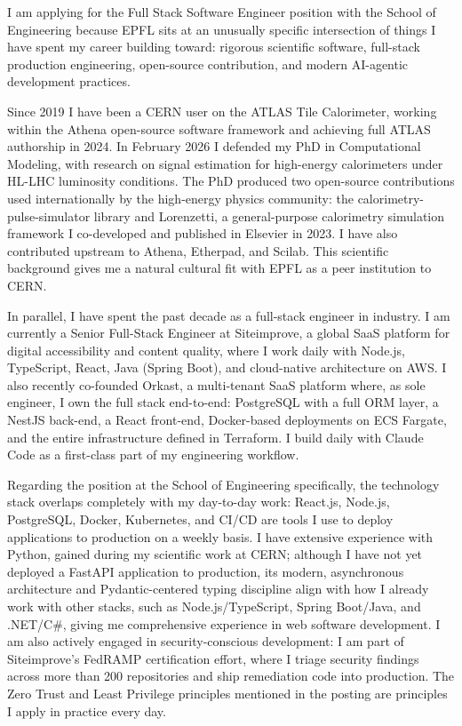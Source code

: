 \documentclass[11pt,a4paper]{article}
\begin{document}


I am applying for the Full Stack Software Engineer position with the School of Engineering because EPFL sits at an unusually specific intersection of things I have spent my career building toward: rigorous scientific software, full-stack production engineering, open-source contribution, and modern AI-agentic development practices.

Since 2019 I have been a CERN user on the ATLAS Tile Calorimeter, working within the Athena open-source software framework and achieving full ATLAS authorship in 2024. In February 2026 I defended my PhD in Computational Modeling, with research on signal estimation for high-energy calorimeters under HL-LHC luminosity conditions. The PhD produced two open-source contributions used internationally by the high-energy physics community: the calorimetry-pulse-simulator library and Lorenzetti, a general-purpose calorimetry simulation framework I co-developed and published in Elsevier in 2023. I have also contributed upstream to Athena, Etherpad, and Scilab. This scientific background gives me a natural cultural fit with EPFL as a peer institution to CERN.

In parallel, I have spent the past decade as a full-stack engineer in industry. I am currently a Senior Full-Stack Engineer at Siteimprove, a global SaaS platform for digital accessibility and content quality, where I work daily with Node.js, TypeScript, React, Java (Spring Boot), and cloud-native architecture on AWS. I also recently co-founded Orkast, a multi-tenant SaaS platform where, as sole engineer, I own the full stack end-to-end: PostgreSQL with a full ORM layer, a NestJS back-end, a React front-end, Docker-based deployments on ECS Fargate, and the entire infrastructure defined in Terraform. I build daily with Claude Code as a first-class part of my engineering workflow.

Regarding the position at the School of Engineering specifically, the technology stack overlaps completely with my day-to-day work: React.js, Node.js, PostgreSQL, Docker, Kubernetes, and CI/CD are tools I use to deploy applications to production on a weekly basis. I have extensive experience with Python, gained during my scientific work at CERN; although I have not yet deployed a FastAPI application to production, its modern, asynchronous architecture and Pydantic-centered typing discipline align with how I already work with other stacks, such as Node.js/TypeScript, Spring Boot/Java, and .NET/C\#, giving me comprehensive experience in web software development. I am also actively engaged in security-conscious development: I am part of Siteimprove's FedRAMP certification effort, where I triage security findings across more than 200 repositories and ship remediation code into production. The Zero Trust and Least Privilege principles mentioned in the posting are principles I apply in practice every day.
\end{document}
